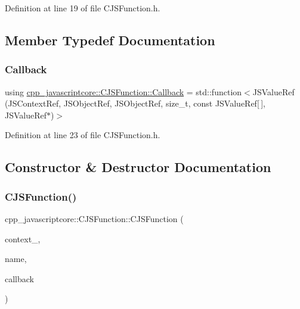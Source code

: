 Definition at line 19 of file C\+J\+S\+Function.\+h.



\subsection{Member Typedef Documentation}
\mbox{\label{classcpp__javascriptcore_1_1_c_j_s_function_a3cf83c4e33bfeafbe770047bb75556f5}} 
\subsubsection{\texorpdfstring{Callback}{Callback}}
{\footnotesize\ttfamily using \mbox{\hyperlink{classcpp__javascriptcore_1_1_c_j_s_function_a3cf83c4e33bfeafbe770047bb75556f5}{cpp\+\_\+javascriptcore\+::\+C\+J\+S\+Function\+::\+Callback}} =  std\+::function$<$J\+S\+Value\+Ref (J\+S\+Context\+Ref, J\+S\+Object\+Ref, J\+S\+Object\+Ref, size\+\_\+t, const J\+S\+Value\+Ref\mbox{[}$\,$\mbox{]}, J\+S\+Value\+Ref$\ast$)$>$}



Definition at line 23 of file C\+J\+S\+Function.\+h.



\subsection{Constructor \& Destructor Documentation}
\mbox{\label{classcpp__javascriptcore_1_1_c_j_s_function_a8d6cf6e461f0ba2fa1d644b68bedfb93}} 
\subsubsection{\texorpdfstring{C\+J\+S\+Function()}{CJSFunction()}}
{\footnotesize\ttfamily cpp\+\_\+javascriptcore\+::\+C\+J\+S\+Function\+::\+C\+J\+S\+Function (\begin{DoxyParamCaption}\item[{J\+S\+Context\+Ref}]{context\+\_\+,  }\item[{const std\+::string \&}]{name,  }\item[{\mbox{\hyperlink{classcpp__javascriptcore_1_1_c_j_s_function_a3cf83c4e33bfeafbe770047bb75556f5}{Callback}} \&}]{callback }\end{DoxyParamCaption})}




